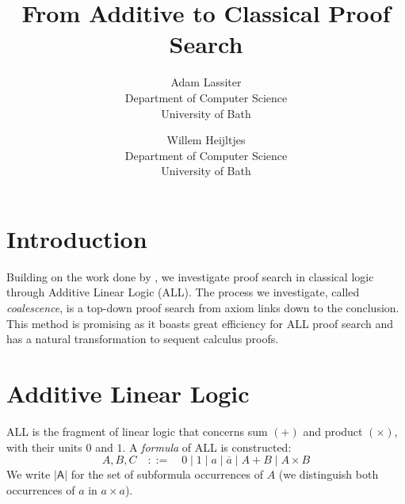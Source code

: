 \documentclass{article}
\title{From Additive to Classical Proof Search}
\author{Adam Lassiter\\Department of Computer Science\\University of Bath \and Willem Heijltjes\\Department of Computer Science\\University of Bath}
\date{}
\newcommand\0{0}
\newcommand\1{1}
\newcommand\+{+}
\renewcommand\*{\times}
\newcommand\subs[1]{\mathsf{|#1|}}
\def\defeq{::=}
\theoremstyle{indented}
\newcommand\dual{\overline}
\begin{document}
    {\let\newpage\relax\maketitle}

    \maketitle


    \section*{Introduction}
        Building on the work done by \citet{petri-nets}, we investigate proof search in classical logic through Additive Linear Logic (ALL).
        The process we investigate, called \textit{coalescence}, is a top-down proof search from axiom links down to the conclusion.
        This method is promising as it boasts great efficiency for ALL proof search and has a natural transformation to sequent calculus proofs.



    \section*{Additive Linear Logic}
        ALL is the fragment of linear logic that concerns sum $(+)$ and product $(\*)$, with their units $0$ and $1$. A \emph{formula} of ALL is constructed:
        \begin{equation*}
            A, B, C \quad \defeq \quad 0 \mid 1 \mid a \mid \dual a \mid A + B \mid A \* B
        \end{equation*}
        We write $\subs A$ for the set of subformula occurrences of $A$ (we distinguish both occurrences of $a$ in $a\*a$).
\end{document}
